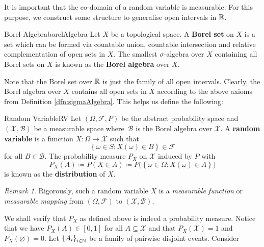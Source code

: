 \documentclass[math]{amznotes}
\theoremstyle{remark}
\newtheorem*{remark}{Remark}
\newcommand{\0}{\mathbf{0}}
\newcommand{\1}{\mathbf{1}}
\begin{document}
It is important that the co-domain of a random variable is measurable. For this purpose, we construct some structure to generalise open intervals in $\mathbb{R}$.
\begin{dfnbox}{Borel Algebra}{borelAlgebra}
    Let $X$ be a topological space. A {\color{red} \textbf{Borel set}} on $X$ is a set which can be formed via countable union, countable intersection and relative complementation of open sets in $X$. The smallest $\sigma$-algebra over $X$ containing all Borel sets on $X$ is known as the {\color{red} \textbf{Borel algebra}} over $X$.
\end{dfnbox}
Note that the Borel set over $\mathbb{R}$ is just the family of all open intervals. Clearly, the Borel algebra over $X$ contains all open sets in $X$ according to the above axioms from Definition \ref{dfn:sigmaAlgebra}. This helps us define the following:
\begin{dfnbox}{Random Variable}{RV}
    Let $\left(\Omega, \mathcal{F}, P\right)$ be the abstract probability space and $\left(\mathcal{X}, \mathcal{B}\right)$ be a measurable space where~$\mathcal{B}$ is the Borel algebra over $\mathcal{X}$. A {\color{red} \textbf{random variable}} is a function $X \colon \Omega \to \mathcal{X}$ such that 
    \begin{equation*}
        \left\{\omega \in S \colon X\left(\omega\right) \in B\right\} \in \mathcal{F} 
    \end{equation*}
    for all $B \in \mathcal{B}$. The probability measure $P_X$ on $\mathcal{X}$ induced by $P$ with 
    \begin{equation*}
        P_X\left(A\right) \coloneqq P\left(X \in A\right) \coloneqq P\bigl(\left\{\omega \in \Omega \colon X\left(\omega\right) \in A\right\}\bigr)
    \end{equation*}
    is known as the {\color{red} \textbf{distribution}} of $X$.
\end{dfnbox}
\begin{notebox}
    \begin{remark}
        Rigorously, such a random variable $X$ is a \textit{measurable function} or \textit{measurable mapping} from $\left(\Omega, \mathcal{F}\right)$ to $\left(\mathcal{X}, \mathcal{B}\right)$.
    \end{remark}
\end{notebox}
We shall verify that $P_X$ as defined above is indeed a probability measure. Notice that we have $P_X\left(A\right) \in \left[0, 1\right]$ for all $A \subseteq \mathcal{X}$ and that $P_X\left(\mathcal{X}\right) = 1$ and $P_X\left(\varnothing\right) = 0$. Let $\left\{A_i\right\}_{i \in \mathbb{N}}$ be a family of pairwise disjoint events. Consider 
\end{document}
